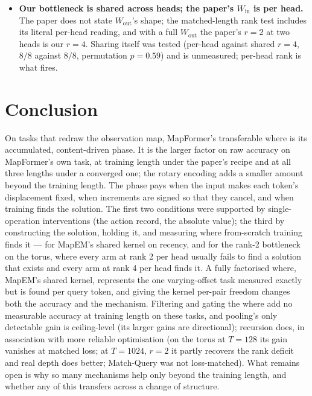 \documentclass[10pt]{article}
\begin{document}
\begin{itemize}
12-heading budget curve and several appendix results are exploratory (at $n=3$ the detectability rule is a
10.7\% false-positive test); Match-Query does not reproduce across batches or same-seed retrains, so its paired
interactions are withdrawn.
\item \textbf{Our bottleneck is shared across heads; the paper's $W_{\mathrm{in}}$ is per head.} The paper does
not state $W_{\mathrm{out}}$'s shape; the matched-length rank test includes its literal per-head reading, and with a
full $W_{\mathrm{out}}$ the paper's $r=2$ at two heads is our $r=4$. Sharing itself was tested (per-head against
shared $r=4$, $8/8$ against $8/8$, permutation $p=0.59$) and is unmeasured; per-head rank is what fires.
\end{itemize}

\section{Conclusion}
\label{sec:conclusion}

On tasks that redraw the observation map, MapFormer's transferable where is its accumulated, content-driven phase.
It is the larger factor on raw accuracy on MapFormer's own task, at training length under the paper's recipe and at
all three lengths under a converged one; the rotary encoding adds a smaller amount beyond the training length. The
phase pays when the input makes each token's displacement fixed, when increments are signed so that they cancel,
and when training finds the solution. The first two conditions were supported by single-operation interventions
(the action record, the absolute value); the third by constructing the solution, holding it, and measuring where
from-scratch training finds it --- for MapEM's shared kernel on recency, and for the rank-2 bottleneck on the torus,
where every arm at rank 2 per head usually fails to find a solution that exists and every arm at rank 4 per head finds it.
A fully factorised where, MapEM's shared kernel, represents the one varying-offset task measured exactly but is found
per query token, and giving the kernel per-pair freedom changes both the accuracy and the mechanism. Filtering and
gating the where add no measurable accuracy at training length on these tasks, and pooling's only detectable gain is ceiling-level (its larger gains are
directional); recursion does, in association with more reliable optimisation (on the torus at $T=128$ its gain vanishes at matched loss; at $T=1024$, $r=2$ it partly recovers the rank deficit and
real depth does better; Match-Query was not loss-matched). What remains open is why so many mechanisms
help only beyond the training length, and whether any of this transfers across a change of structure.
\end{document}
